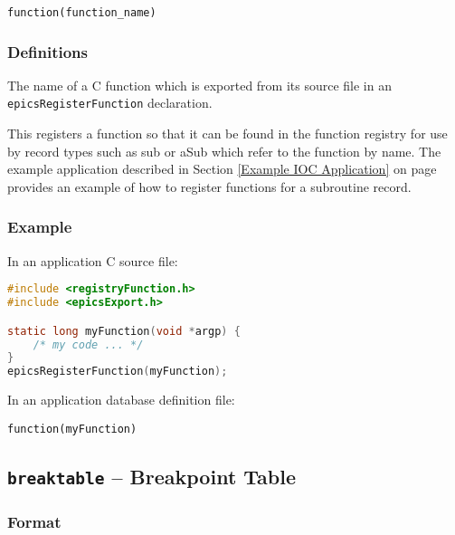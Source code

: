 \begin{lstlisting}[language=dbd]
function(function_name)
\end{lstlisting}

\subsubsection{Definitions}

\begin{description}
\item [function\_name] The name of a C function which is exported from its source file in an \verb|epicsRegisterFunction| declaration.
\end{description}

This registers a function so that it can be found in the function registry for use by record types such as sub or aSub which refer to the function by name.
The example application described in Section \ref{Example IOC Application} on page \pageref{Example IOC Application} provides an example of how to register functions for a subroutine record.

\subsubsection{Example}

In an application C source file:

\begin{lstlisting}[language=C]
#include <registryFunction.h>
#include <epicsExport.h>

static long myFunction(void *argp) {
    /* my code ... */
}
epicsRegisterFunction(myFunction);
\end{lstlisting}

In an application database definition file:

\begin{lstlisting}[language=dbd]
function(myFunction)
\end{lstlisting}

\subsection{\texttt{breaktable} -- Breakpoint Table}

\subsubsection{Format}

